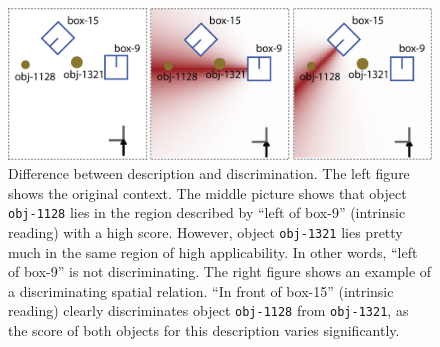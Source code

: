 \begin{figure}
\begin{centering}
\includegraphics[width=1\columnwidth]{figs/description-vs-discrimination.png}
\end{centering}
\caption[Difference between discrimination and description]
{Difference between description and discrimination. The left figure
shows the original context. The middle picture shows that
object {\footnotesize\tt obj-1128} lies in the region described by ``left of box-9'' 
(intrinsic reading) with a high score. However, object {\footnotesize\tt obj-1321}
lies pretty much in the same region of high applicability. In other words,
``left of box-9'' is not discriminating. The right figure shows an example of
a discriminating spatial relation. ``In front of box-15'' (intrinsic reading) 
clearly discriminates object {\footnotesize\tt obj-1128} from {\footnotesize\tt obj-1321},
as the score of both objects for this description varies significantly.}
\label{f:discrimination-vs-description}
\end{figure}

